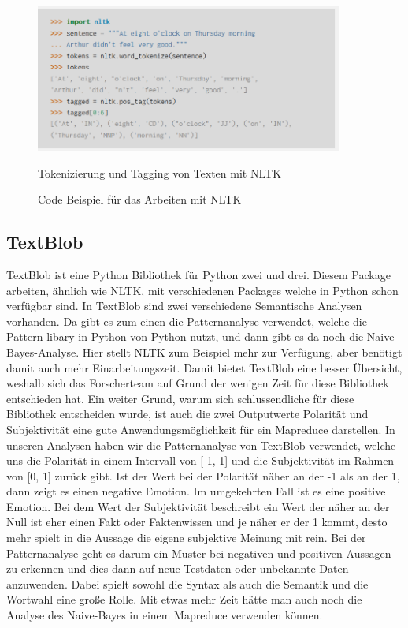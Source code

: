 	\begin{figure}[ht]
		\centering
		\includegraphics[width=0.9\textwidth]{images/Kapitel2/Code_Beispiel_2}
			\caption{\label{fig:CodeBeispiel}Code Beispiel für das Arbeiten mit NLTK}{Tokenizierung und Tagging von Texten mit NLTK}
	\end{figure}    	
		
	
	
	\subsection{TextBlob}
	
	TextBlob ist eine Python Bibliothek für Python zwei und drei. Diesem Package arbeiten, ähnlich wie NLTK, mit verschiedenen Packages welche in Python schon 
	verfügbar sind. In TextBlob sind zwei verschiedene Semantische Analysen vorhanden. Da gibt es zum einen die Patternanalyse verwendet, welche die Pattern 
	libary in Python von Python nutzt, und dann gibt es da noch die Naive-Bayes-Analyse.  Hier stellt NLTK zum Beispiel mehr zur Verfügung, aber 
	benötigt damit auch mehr Einarbeitungszeit. Damit bietet TextBlob eine besser Übersicht, weshalb sich das Forscherteam auf Grund der wenigen Zeit für 
	diese Bibliothek entschieden hat. Ein weiter Grund, warum sich schlussendliche für diese Bibliothek entscheiden wurde, ist auch die zwei Outputwerte 
	Polarität und Subjektivität eine gute Anwendungsmöglichkeit für ein Mapreduce darstellen. 	
	In unseren Analysen haben wir die Patternanalyse von TextBlob verwendet, welche uns die Polarität in einem Intervall von [-1, 1] und die Subjektivität im 
	Rahmen von [0, 1] zurück gibt. Ist der Wert bei der Polarität näher an der -1 als an der 1, dann zeigt es einen negative Emotion. Im umgekehrten Fall ist 
	es eine positive Emotion. Bei dem Wert der Subjektivität beschreibt ein Wert der näher an der Null ist eher einen Fakt oder Faktenwissen und je näher er 
	der 1 kommt, desto mehr spielt in die Aussage die eigene subjektive Meinung mit rein. 
	Bei der Patternanalyse geht es darum ein Muster bei negativen und positiven Aussagen zu erkennen und dies dann auf neue Testdaten oder unbekannte Daten 
	anzuwenden. Dabei spielt sowohl die Syntax als auch die Semantik und die Wortwahl eine große Rolle. 
	Mit etwas mehr Zeit hätte man auch noch die Analyse des Naive-Bayes in einem Mapreduce verwenden können.

